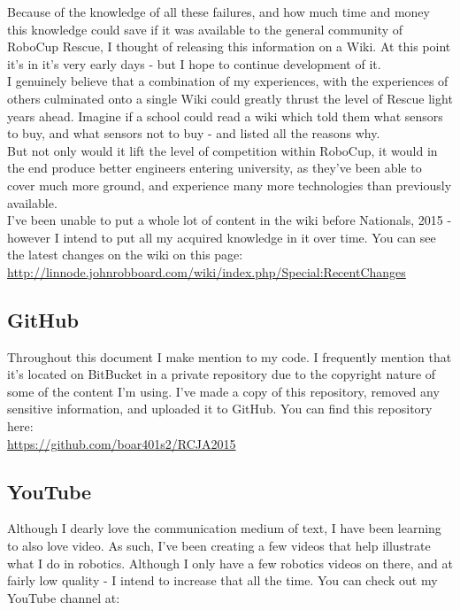             Because of the knowledge of all these failures, and how much time and money this knowledge could save if it was available to the general community of RoboCup Rescue, I thought of releasing this information on a Wiki. At this point it's in it's very early days - but I hope to continue development of it.\\
            
            I genuinely believe that a combination of my experiences, with the experiences of others culminated onto a single Wiki could greatly thrust the level of Rescue light years ahead. Imagine if a school could read a wiki which told them what sensors to buy, and what sensors not to buy - and listed all the reasons why.\\
            
            But not only would it lift the level of competition within RoboCup, it would in the end produce better engineers entering university, as they've been able to cover much more ground, and experience many more technologies than previously available.\\
            
            I've been unable to put a whole lot of content in the wiki before Nationals, 2015 - however I intend to put all my acquired knowledge in it over time. You can see the latest changes on the wiki on this page:\\
            
			\url{http://linnode.johnrobboard.com/wiki/index.php/Special:RecentChanges}\\
		
		\subsection*{GitHub}
			Throughout this document I make mention to my code. I frequently mention that it's located on BitBucket in a private repository due to the copyright nature of some of the content I'm using. I've made a copy of this repository, removed any sensitive information, and uploaded it to GitHub. You can find this repository here:\\
			
			\url{https://github.com/boar401s2/RCJA2015}

        \subsection*{YouTube}
            Although I dearly love the communication medium of text, I have been learning to also love video. As such, I've been creating a few videos that help illustrate what I do in robotics. Although I only have a few robotics videos on there, and at fairly low quality - I intend to increase that all the time. You can check out my YouTube channel at:\\
            
